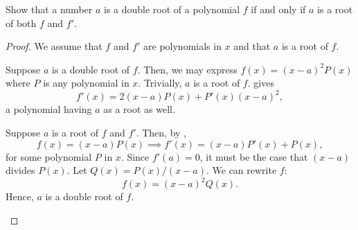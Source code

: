 \begin{problem}
  Show that a number $a$ is a double root of a polynomial $f$ if and only if $a$ is a root of both $f$ and $f'$.

  \begin{proof}
    We assume that $f$ and $f'$ are polynomials in $x$ and that $a$ is a root of $f$.
    \vspace{\baselineskip}

    \begin{forwardimplication}
      Suppose $a$ is a double root of $f$. Then, we may express $f(x) = (x - a)^{2}P(x)$ where $P$ is any polynomial in $x$.
      Trivially, $a$ is a root of $f$.  gives
      \[
        f'(x) = 2(x - a)P(x) + P'(x)(x - a)^{2},
      \]
      a polynomial having $a$ as a root as well.
    \end{forwardimplication}
    \vspace{\baselineskip}

    \begin{backwardimplication}
      Suppose $a$ is a root of $f$ and $f'$. Then, by ,
      \[
        f(x) = (x-a)P(x) \implies f'(x) = (x-a)P'(x) + P(x),
      \]
      for some polynomial $P$ in $x$.
      Since $f'(a) = 0$, it must be the case that $(x - a)$ divides $P(x)$. Let
      $Q(x) = P(x) / (x-a)$. We can rewrite $f$:
      \[
        f(x) = (x-a)^{2}Q(x).
      \]
      Hence, $a$ is a double root of $f$.
    \end{backwardimplication}
  \end{proof}
\end{problem}
